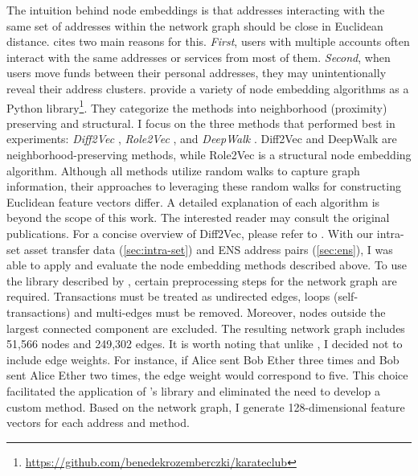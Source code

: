 \documentclass[12pt,a4paper,titlepage,oneside,english]{article}
\begin{document}
The intuition behind node embeddings is that addresses interacting with the same set of addresses within the network graph should be close in Euclidean distance. \cite{Beres2020} cites two main reasons for this. \textit{First}, users with multiple accounts often interact with the same addresses or services from most of them. \textit{Second}, when users move funds between their personal addresses, they may unintentionally reveal their address clusters. \newline
\cite{karateclub} provide a variety of node embedding algorithms as a Python library\footnote{\url{https://github.com/benedekrozemberczki/karateclub}}. They categorize the methods into neighborhood (proximity) preserving and structural. \newline
I focus on the three methods that performed best in \cite{Beres2020} experiments: \textit{Diff2Vec} \citep{rozemberczki2020difftovec}, \textit{Role2Vec} \citep{ahmed2018roletovec}, and \textit{DeepWalk} \citep{perozzi2014}. Diff2Vec and DeepWalk are neighborhood-preserving methods, while Role2Vec is a structural node embedding algorithm. Although all methods utilize random walks to capture graph information, their approaches to leveraging these random walks for constructing Euclidean feature vectors differ. A detailed explanation of each algorithm is beyond the scope of this work. The interested reader may consult the original publications. For a concise overview of Diff2Vec, please refer to \cite{wu2022tutela}. \newline
With our intra-set asset transfer data (\ref{sec:intra-set}) and ENS address pairs (\ref{sec:ens}), I was able to apply and evaluate the node embedding methods described above. To use the library described by \cite{karateclub}, certain preprocessing steps for the network graph are required. Transactions must be treated as undirected edges, loops (self-transactions) and multi-edges must be removed. Moreover, nodes outside the largest connected component are excluded. The resulting network graph includes 51,566 nodes and 249,302 edges. \newline
It is worth noting that unlike \cite{wu2022tutela}, I decided not to include edge weights. For instance, if Alice sent Bob Ether three times and Bob sent Alice Ether two times, the edge weight would correspond to five. This choice facilitated the application of \cite{rozemberczki2020difftovec}'s library and eliminated the need to develop a custom method. Based on the network graph, I generate 128-dimensional feature vectors for each address and method. \newline
\end{document}
